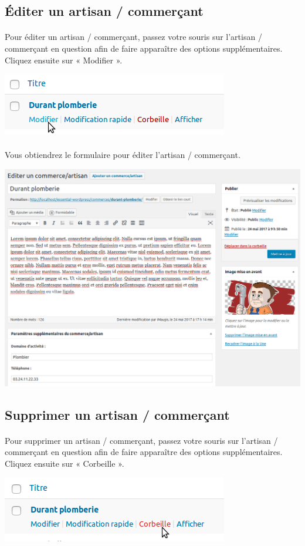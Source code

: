 \documentclass[10pt,a4paper]{article}
\begin{document}
\subsection{Éditer un artisan / commerçant}
\paragraph{}Pour éditer un artisan / commerçant, passez votre souris sur l’artisan / commerçant en question afin de faire apparaître des options supplémentaires. Cliquez ensuite sur « Modifier ».
\begin{center}
\includegraphics[scale=0.3]{img/0311.png}
\end{center}
\paragraph{}Vous obtiendrez le formulaire pour éditer l'artisan / commerçant.
\begin{center}
\includegraphics[scale=0.3]{img/0312.png}
\end{center}
\newpage
\subsection{Supprimer un artisan / commerçant}
\paragraph{}Pour supprimer un artisan / commerçant, passez votre souris sur l’artisan / commerçant en question afin de faire apparaître des options supplémentaires. Cliquez ensuite sur « Corbeille ».
\begin{center}
\includegraphics[scale=0.3]{img/0313.png}
\end{center}
\end{document}
